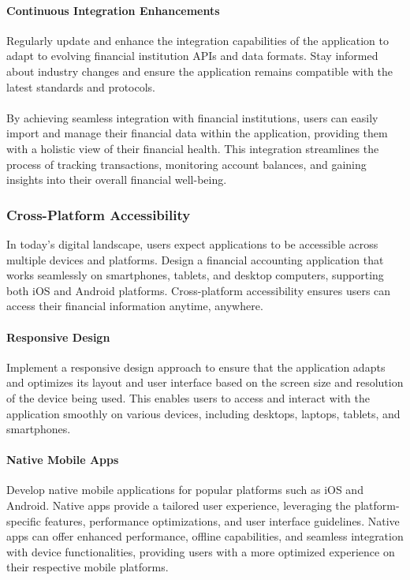 \paragraph{Continuous Integration Enhancements}
Regularly update and enhance the integration capabilities of the application to 
adapt to evolving financial institution APIs and data formats. Stay informed about industry changes and ensure the 
application remains compatible with the latest standards and protocols.
\\
\\
By achieving seamless integration with financial institutions, users can easily import and manage their financial 
data within the application, providing them with a holistic view of their financial health. This integration streamlines 
the process of tracking transactions, monitoring account balances, and gaining insights into their overall financial 
well-being.


\subsubsection{Cross-Platform Accessibility}
In today's digital landscape, users expect applications to be accessible across multiple devices and platforms. 
Design a financial accounting application that works seamlessly on smartphones, tablets, and desktop computers, 
supporting both iOS and Android platforms. Cross-platform accessibility ensures users can access their financial 
information anytime, anywhere.

\paragraph{Responsive Design}
Implement a responsive design approach to ensure that the application adapts and optimizes its layout and user 
interface based on the screen size and resolution of the device being used. This enables users to access and interact 
with the application smoothly on various devices, including desktops, laptops, tablets, and smartphones.

\paragraph{Native Mobile Apps}
Develop native mobile applications for popular platforms such as iOS and Android. Native apps provide a tailored 
user experience, leveraging the platform-specific features, performance optimizations, and user interface guidelines. 
Native apps can offer enhanced performance, offline capabilities, and seamless integration with device functionalities, 
providing users with a more optimized experience on their respective mobile platforms.

